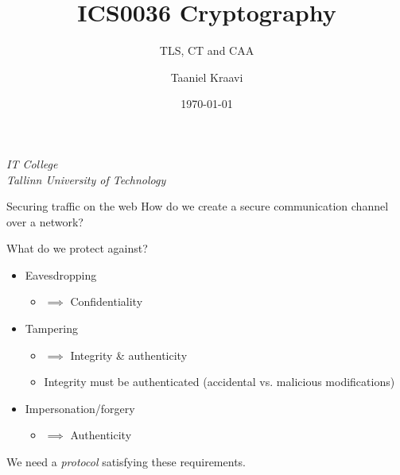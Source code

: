 \usepackage{tikz}
\usetikzlibrary{positioning,calc,external}

\title{ICS0036 Cryptography}
\subtitle{TLS, CT and CAA}
\date{\today}
\author{Taaniel Kraavi}
\institute%
{%
  \textit{IT College}\\
  \textit{Tallinn University of Technology}
}


\begin{frame}
  \titlepage
\end{frame}

\begin{frame}{Securing traffic on the web}
  How do we create a secure communication channel over a network?

  \vspace*{1em}

  \pause
  What do we protect against?
  \begin{itemize}[<+(1)->]
    \item Eavesdropping
    \begin{itemize}
      \item $\implies$ Confidentiality
    \end{itemize}
    \item Tampering
    \begin{itemize}
      \item $\implies$ Integrity \& authenticity
      \item Integrity must be authenticated (accidental vs. malicious modifications)
    \end{itemize}
    \item Impersonation/forgery
    \begin{itemize}
      \item $\implies$ Authenticity
    \end{itemize}
  \end{itemize}

  \vspace*{1em}

  \pause
  We need a \emph{protocol} satisfying these requirements.
\end{frame}


